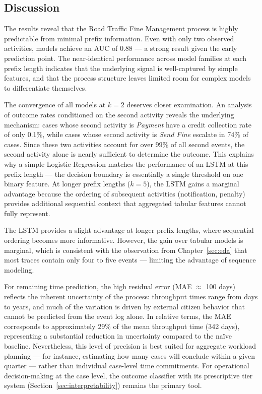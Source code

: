 \subsection{Discussion}

The results reveal that the Road Traffic Fine Management process is highly predictable from minimal prefix information. Even with only two observed activities, models achieve an AUC of 0.88 — a strong result given the early prediction point. The near-identical performance across model families at each prefix length indicates that the underlying signal is well-captured by simple features, and that the process structure leaves limited room for complex models to differentiate themselves.

The convergence of all models at $k=2$ deserves closer examination. An analysis of outcome rates conditioned on the second activity reveals the underlying mechanism: cases whose second activity is \textit{Payment} have a credit collection rate of only 0.1\%, while cases whose second activity is \textit{Send Fine} escalate in 74\% of cases. Since these two activities account for over 99\% of all second events, the second activity alone is nearly sufficient to determine the outcome. This explains why a simple Logistic Regression matches the performance of an LSTM at this prefix length — the decision boundary is essentially a single threshold on one binary feature. At longer prefix lengths ($k=5$), the LSTM gains a marginal advantage because the ordering of subsequent activities (notification, penalty) provides additional sequential context that aggregated tabular features cannot fully represent.

The LSTM provides a slight advantage at longer prefix lengths, where sequential ordering becomes more informative. However, the gain over tabular models is marginal, which is consistent with the observation from Chapter~\ref{sec:eda} that most traces contain only four to five events — limiting the advantage of sequence modeling.

For remaining time prediction, the high residual error (MAE $\approx$ 100 days) reflects the inherent uncertainty of the process: throughput times range from days to years, and much of the variation is driven by external citizen behavior that cannot be predicted from the event log alone. In relative terms, the MAE corresponds to approximately 29\% of the mean throughput time (342 days), representing a substantial reduction in uncertainty compared to the naïve baseline. Nevertheless, this level of precision is best suited for aggregate workload planning — for instance, estimating how many cases will conclude within a given quarter — rather than individual case-level time commitments. For operational decision-making at the case level, the outcome classifier with its prescriptive tier system (Section~\ref{sec:interpretability}) remains the primary tool.
